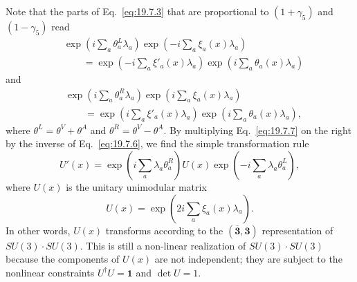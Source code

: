 Note that the parts of Eq.~\eqref{eq:19.7.3} that are proportional to $(1+\gamma_5)$ and $(1-\gamma_5)$ read
\begin{equation}
\begin{split}
&\exp\left(i\sum_a\theta_a^L\lambda_a\right)
\exp\left(-i\sum_a\xi_a(x)\lambda_a\right)
\\
&\qquad
=\exp\left(-i\sum_a\xi'_a(x)\lambda_a\right)
\exp\left(i\sum_a\theta_a(x)\lambda_a\right)
\end{split}
\tag{19.7.6}\label{eq:19.7.6}
\end{equation}
and
\begin{equation}
\begin{split}
&\exp\left(i\sum_a\theta_a^R\lambda_a\right)
\exp\left(i\sum_a\xi_a(x)\lambda_a\right)
\\
&\qquad
=\exp\left(i\sum_a\xi'_a(x)\lambda_a\right)
\exp\left(i\sum_a\theta_a(x)\lambda_a\right),
\end{split}
\tag{19.7.7}\label{eq:19.7.7}
\end{equation}
where $\theta^L=\theta^V+\theta^A$ and $\theta^R=\theta^V-\theta^A$. By multiplying Eq.~\eqref{eq:19.7.7} on the right by the inverse of Eq.~\eqref{eq:19.7.6}, we find the simple transformation rule
\begin{equation}
U'(x)
=\exp\left(i\sum_a\lambda_a\theta_a^R\right)
U(x)
\exp\left(-i\sum_a\lambda_a\theta_a^L\right),
\tag{19.7.8}\label{eq:19.7.8}
\end{equation}
where $U(x)$ is the unitary unimodular matrix
\begin{equation}
U(x)=\exp\left(2i\sum_a\xi_a(x)\lambda_a\right).
\tag{19.7.9}\label{eq:19.7.9}
\end{equation}
In other words, $U(x)$ transforms according to the $(\overline{\mathbf 3},\mathbf 3)$ representation of $SU(3)\cdot SU(3)$. This is still a non-linear realization of $SU(3)\cdot SU(3)$ because the components of $U(x)$ are not independent; they are subject to the nonlinear constraints $U^\dagger U=\mathbf 1$ and $\det U=1$.

